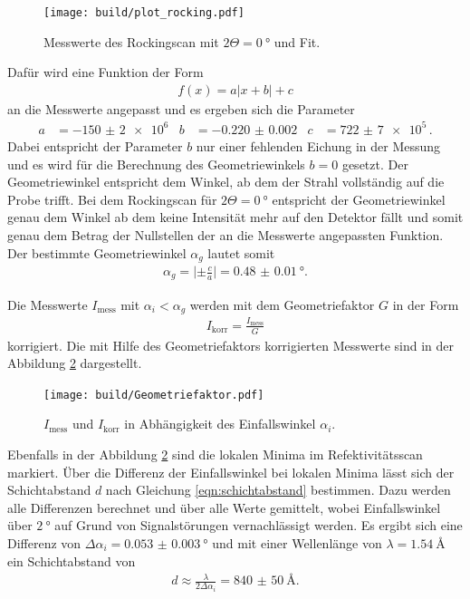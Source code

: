 \begin{figure}
  \centering
  \texttt{[image: build/plot\_rocking.pdf]}
  \caption{Messwerte des Rockingscan mit $2\Theta = \SI{0}{\degree}$ und Fit.}
  \label{fig:rock_scan_0}
\end{figure}

Dafür wird eine Funktion der Form
\begin{align}
  f(x) = a \lvert x + b \rvert + c
\end{align}
an die Messwerte angepasst und es ergeben sich die Parameter
\begin{align}
  a&=-\num{150(2)e6}  &b&=\num{-0.220(2)}  &c&=\num{722(7)e5} \, .
\end{align}
Dabei entspricht der Parameter $b$ nur einer fehlenden Eichung in der Messung und
es wird für die Berechnung des Geometriewinkels $b=0$ gesetzt.
Der Geometriewinkel entspricht dem Winkel, ab dem der Strahl
vollständig auf die Probe trifft. Bei dem Rockingscan für $2\Theta=\SI{0}{\degree}$
entspricht der Geometriewinkel genau dem Winkel ab dem keine Intensität
mehr auf den Detektor fällt und somit genau dem Betrag der Nullstellen der an die Messwerte
angepassten Funktion.
Der bestimmte Geometriewinkel $\alpha_g$
lautet somit
\begin{align}
\alpha_g = \lvert \pm\frac{c}{a} \rvert = \SI{0.48(1)}{\degree}.
\end{align}


Die Messwerte $I_{\mathrm{mess}}$ mit $\alpha_i < \alpha_g $ werden mit dem Geometriefaktor $G$
in der Form
\begin{align}
  I_{\mathrm{korr}} = \frac{I_{\mathrm{mess}}}{G}
\end{align}
korrigiert. Die mit Hilfe des Geometriefaktors korrigierten Messwerte sind in der Abbildung \ref{fig:korr} dargestellt.
\begin{figure}
  \centering
  \texttt{[image: build/Geometriefaktor.pdf]}
  \caption{$I_{\mathrm{mess}}$ und $I_{\mathrm{korr}}$ in Abhängigkeit des Einfallswinkel $\alpha_i$.}
  \label{fig:korr}
\end{figure}

Ebenfalls in der Abbildung \ref{fig:korr}
sind die lokalen Minima im Refektivitätsscan markiert.
Über die Differenz der Einfallswinkel bei lokalen Minima lässt
sich der Schichtabstand $d$ nach Gleichung \eqref{eqn:schichtabstand}
bestimmen.
Dazu werden alle Differenzen
berechnet und über alle Werte gemittelt, wobei Einfallswinkel
über $\SI{2}{\degree}$ auf Grund von Signalstörungen vernachlässigt werden.
Es ergibt sich eine Differenz von $\Delta \alpha_i = \SI{0.053(3)}{\degree}$
und mit einer Wellenlänge von $\lambda=\SI{1.54}{\angstrom}$
ein Schichtabstand von
\begin{align}
d \approx \frac{\lambda}{2\Delta\alpha_i} = \SI{840(50)}{\angstrom}.
\end{align}

